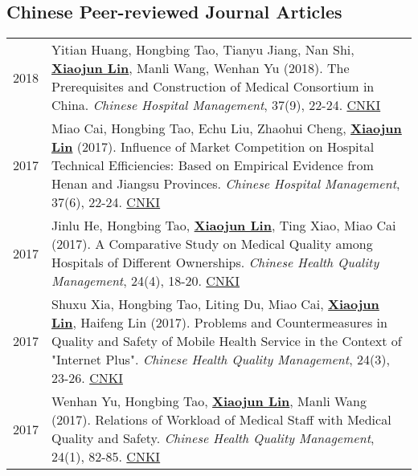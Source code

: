 \documentclass[a4paper,10pt]{article}
\begin{document}
\subsection*{Chinese Peer-reviewed Journal Articles}
\begin{longtable}{r p{13cm}}
2018 & Yitian Huang, Hongbing Tao, Tianyu Jiang, Nan Shi, \underline{\textbf{Xiaojun Lin}}, Manli Wang, Wenhan Yu (2018). The Prerequisites and Construction of Medical Consortium in China. \emph{ Chinese Hospital Management}, 37(9), 22-24. \href{http://kns.cnki.net/KCMS/detail/detail.aspx?dbcode=CJFQ&dbname=CJFDLAST2018&filename=YYGL201809005&v=MjIxMjdlWnVadEZpRGxWNzNPUERUTVlyRzRIOW5NcG85RllZUjhlWDFMdXhZUzdEaDFUM3FUcldNMUZyQ1VSTEs=}{CNKI} \\
2017 & Miao Cai, Hongbing Tao, Echu Liu, Zhaohui Cheng, \underline{\textbf{Xiaojun Lin}} (2017). Influence of Market Competition on Hospital Technical Efficiencies: Based on Empirical Evidence from Henan and Jiangsu Provinces. \emph{ Chinese Hospital Management}, 37(6), 22-24. 
\href{http://kns.cnki.net/KCMS/detail/detail.aspx?dbcode=CJFQ&dbname=CJFDLAST2017&filename=YYGL201706012&v=MzEzMTREbFZMdkFQRFRNWXJHNEg5Yk1xWTlFWm9SOGVYMUx1eFlTN0RoMVQzcVRyV00xRnJDVVJMS2VadVp0Rmk=}{CNKI}\\
2017 & Jinlu He, Hongbing Tao, \underline{\textbf{Xiaojun Lin}}, Ting Xiao, Miao Cai (2017). A Comparative Study on Medical Quality among Hospitals of Different Ownerships. \emph{ Chinese Health Quality Management}, 24(4), 18-20. \href{http://kns.cnki.net/KCMS/detail/detail.aspx?dbcode=CJFQ&dbname=CJFDLAST2017&filename=WSJG201704010&v=MTU5NzM0OUVaSVI4ZVgxTHV4WVM3RGgxVDNxVHJXTTFGckNVUkxLZVp1WnRGaURtVTcvTU1qN0JhYkc0SDliTXE=}{CNKI}\\
2017 & Shuxu Xia, Hongbing Tao, Liting Du, Miao Cai, \underline{\textbf{Xiaojun Lin}}, Haifeng Lin (2017). Problems and Countermeasures in Quality and Safety of Mobile Health Service in the Context of "Internet Plus". \emph{ Chinese Health Quality Management}, 24(3), 23-26. \href{http://kns.cnki.net/KCMS/detail/detail.aspx?dbcode=CJFQ&dbname=CJFDLAST2017&filename=WSJG201703030&v=MjQwMTVHWklSOGVYMUx1eFlTN0RoMVQzcVRyV00xRnJDVVJMS2VadVp0RmlEbVViL01NajdCYWJHNEg5Yk1ySTk=}{CNKI}\\
2017 & Wenhan Yu, Hongbing Tao, \underline{\textbf{Xiaojun Lin}}, Manli Wang (2017). Relations of Workload of Medical Staff with Medical Quality and Safety. \emph{ Chinese Health Quality Management}, 24(1), 82-85. \href{http://kns.cnki.net/KCMS/detail/detail.aspx?dbcode=CJFQ&dbname=CJFDLAST2017&filename=WSJG201701013&v=MDI5NThSOGVYMUx1eFlTN0RoMVQzcVRyV00xRnJDVVJMS2VadVp0RmlEbVY3M09NajdCYWJHNEg5Yk1ybzlFWjQ=}{CNKI}\\

\end{longtable}
\end{document}

